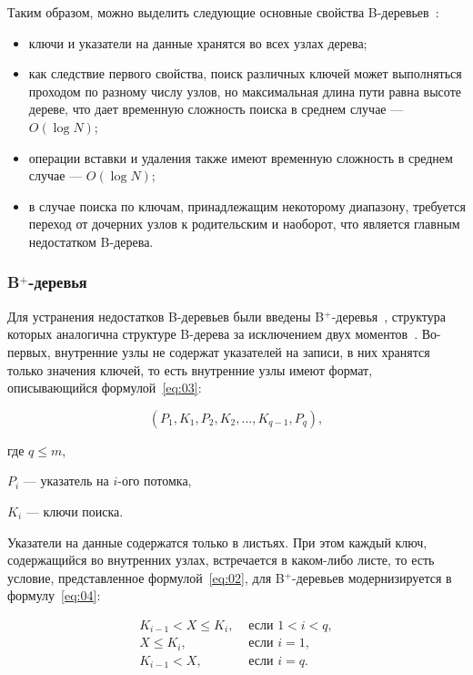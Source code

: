 Таким образом, можно выделить следующие основные свойства
\mbox{B-деревьев}~\cite{marvel}:
\begin{itemize}
    \item ключи и указатели на данные хранятся во всех узлах дерева;
    \item как следствие первого свойства, поиск различных ключей может
        выполняться проходом по разному числу узлов, но максимальная длина пути
        равна высоте дереве, что дает временную сложность поиска в среднем
        случае --- $O(\log N)$;
    \item операции вставки и удаления также имеют временную сложность в среднем
        случае --- $O(\log N)$;
    \item в случае поиска по ключам, принадлежащим некоторому диапазону,
        требуется переход от дочерних узлов к родительским и наоборот, что
        является главным недостатком B-дерева.
\end{itemize}

\subsubsection{B$^+$-деревья}

Для устранения недостатков B-деревьев были введены B$^+$-деревья~\cite{marvel},
структура которых аналогична структуре B-дерева за исключением двух
моментов~\cite{arki}.  Во-первых, внутренние узлы не содержат указателей на
записи, в них хранятся только значения ключей, то есть внутренние узлы имеют
формат, описывающийся формулой~\eqref{eq:03}:

\begin{equation}\label{eq:03}
    (P_1, K_1, P_2, K_2, \dots, K_{q-1}, P_q),
\end{equation}

где $q \leqslant m$,

$P_i$ --- указатель на $i$-ого потомка,

$K_i$ --- ключи поиска.

Указатели на данные содержатся только в листьях. При этом каждый ключ,
содержащийся во внутренних узлах, встречается в каком-либо листе, то есть
условие, представленное формулой~\eqref{eq:02}, для B$^+$-деревьев
модернизируется в формулу~\eqref{eq:04}:

\begin{equation}\label{eq:04}
    \begin{aligned}
        K_{i-1} < X \leqslant K_i, & \text{ если } 1 < i < q,\\
        X \leqslant K_i, & \text{ если } i = 1,\\
        K_{i-1} < X, & \text{ если } i = q.
    \end{aligned}
\end{equation}

